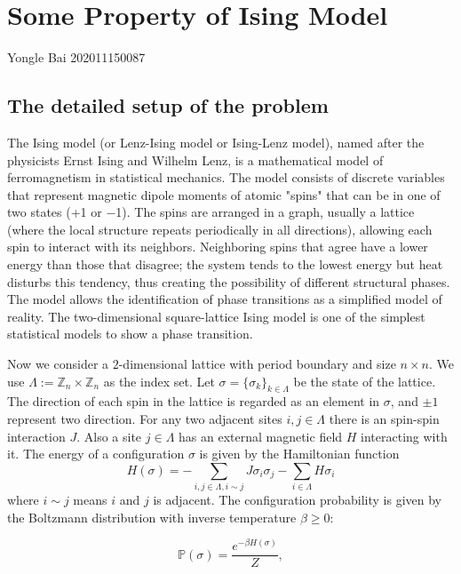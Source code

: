 \documentclass[11pt,openany]{book}              %
\begin{document}
\chapter*{Some Property of Ising Model}
\vspace{-1cm}
{\fontsize{18.0pt}{\baselineskip}\selectfont  Yongle Bai 202011150087}

\section{The detailed setup of the problem}
The Ising model (or Lenz-Ising model or Ising-Lenz model), named after the physicists Ernst Ising and Wilhelm Lenz, is a mathematical model of ferromagnetism in statistical mechanics.
The model consists of discrete variables that represent magnetic dipole moments of atomic "spins" that can be in one of two states (+1 or −1).
The spins are arranged in a graph, usually a lattice (where the local structure repeats periodically in all directions), allowing each spin to interact with its neighbors.
Neighboring spins that agree have a lower energy than those that disagree; the system tends to the lowest energy but heat disturbs this tendency, thus creating the possibility of different structural phases.
The model allows the identification of phase transitions as a simplified model of reality.
The two-dimensional square-lattice Ising model is one of the simplest statistical models to show a phase transition.

Now we consider a \(2\)-dimensional lattice with period boundary and size \(n \times n\).
We use \(\Lambda:=\mathbb{Z}_n \times \mathbb{Z}_n\) as the index set.
Let \(\sigma=\{ \sigma_k\}_{k \in \Lambda}\) be the state of the lattice.
The direction of each spin in the lattice is regarded as an element in \(\sigma\), and \(\pm 1\) represent two direction.
For any two adjacent sites \(i,j\in \Lambda \) there is an spin-spin interaction \(J\).
Also a site \(j\in \Lambda \) has an external magnetic field \(H\) interacting with it. The energy of a configuration \(\sigma\) is given by the Hamiltonian function
\begin{equation}\label{equ:1}
	H(\sigma)=-\sum_{i,j\in\Lambda,i \sim j} J \sigma_i \sigma_j-\sum_{i \in \Lambda}H \sigma_i
\end{equation}
where \(i \sim j\) means \(i\) and \(j\) is adjacent.
The configuration probability is given by the Boltzmann distribution with inverse temperature \( \beta \geq 0\):

\[ \mathbb{P}(\sigma )={\frac {e^{-\beta H(\sigma )}}{Z}},\]
\end{document}
